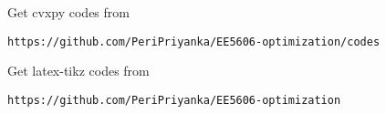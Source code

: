 \documentclass[journal,12pt,twocolumn]{IEEEtran}
\begin{document}
\let\StandardTheFigure\thefigure
\let\vec\mathbf
\renewcommand{\thefigure}{\theproblem}



\def\putbox#1#2#3{\makebox[0in][l]{\makebox[#1][l]{}\raisebox{\baselineskip}[0in][0in]{\raisebox{#2}[0in][0in]{#3}}}}
     \def\rightbox#1{\makebox[0in][r]{#1}}
     \def\centbox#1{\makebox[0in]{#1}}
     \def\topbox#1{\raisebox{-\baselineskip}[0in][0in]{#1}}
     \def\midbox#1{\raisebox{-0.5\baselineskip}[0in][0in]{#1}}

\vspace{3cm}
Get cvxpy codes from
\begin{lstlisting}
https://github.com/PeriPriyanka/EE5606-optimization/codes
\end{lstlisting}
Get latex-tikz codes from 
\begin{lstlisting}
https://github.com/PeriPriyanka/EE5606-optimization
\end{lstlisting}
\end{document}
